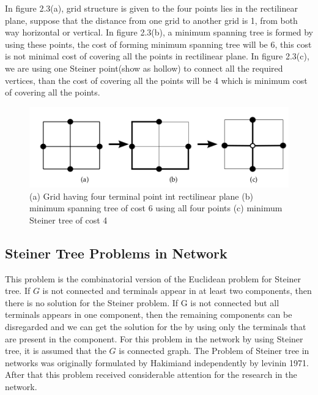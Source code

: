 In figure 2.3(a), grid structure is given to the four points lies in the rectilinear plane, suppose that the distance from one grid to another grid is 1, from both way horizontal or vertical. In figure 2.3(b), a minimum spanning tree is formed by using these points, the cost of forming minimum spanning tree will be 6, this cost is not minimal cost of covering all the points in rectilinear plane. In figure 2.3(c), we are using one Steiner point(show as hollow) to connect all the required vertices, than the cost of covering all the points will be 4 which is minimum cost of covering all the points. 
 \begin{figure}
      \centering
    \includegraphics[scale = 0.4]{rec.png}
  \caption{(a) Grid having four terminal point int rectilinear plane (b) minimum spanning tree of cost 6 using all four points (c) minimum Steiner tree of cost 4}
\end{figure}

\subsection{Steiner Tree Problems in Network}
This problem is the combinatorial version of the Euclidean problem for Steiner tree. If $G$ is not connected and terminals appear in 
at least two components, then there is no solution for the Steiner problem. If G is not connected but all terminals appears in one component, then the remaining components can be disregarded and we can get the solution for the by using only the terminals that are present in the component. For this problem in the network by using Steiner tree, it is assumed that the $G$ is connected graph. The Problem of Steiner tree in networks was originally formulated by Hakimiand independently by levinin 1971. After that this problem received considerable attention for the research in the network.\\

